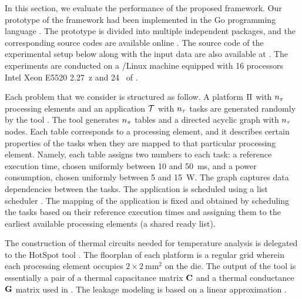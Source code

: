 In this section, we evaluate the performance of the proposed framework. Our
prototype of the framework had been implemented in the Go programming language
\cite{go}. The prototype is divided into multiple independent packages, and the
corresponding source codes are available online \cite{sources}. The source code
of the experimental setup below along with the input data are also available at
\cite{sources}. The experiments are conducted on a /Linux machine
equipped with 16 processors Intel Xeon E5520 2.27~z and 24~ of
.

Each problem that we consider is structured as follow. A platform $\Pi$ with
${n_\pi}$ processing elements and an application $\mathcal{T}$ with ${n_\tau}$ tasks are
generated randomly by the  tool \cite{dick1998}. The tool generates
${n_\pi}$ tables and a directed acyclic graph with ${n_\tau}$ nodes. Each table
corresponds to a processing element, and it describes certain properties of the
tasks when they are mapped to that particular processing element. Namely, each
table assigns two numbers to each task: a reference execution time, chosen
uniformly between 10 and 50~ms, and a power consumption, chosen uniformly
between 5 and 15~W. The graph captures data dependencies between the tasks. The
application is scheduled using a list scheduler \cite{adam1974}. The mapping of
the application is fixed and obtained by scheduling the tasks based on their
reference execution times and assigning them to the earliest available
processing elements (a shared ready list).

The construction of thermal  circuits needed for temperature analysis
is delegated to the HotSpot tool \cite{skadron2004}. The floorplan of each
platform is a regular grid wherein each processing element occupies $2 \times
2~\text{mm}^2$ on the die. The output of the tool is essentially a pair of a
thermal capacitance matrix $\mathbf{C}$ and a thermal conductance $\mathbf{G}$ matrix used in
. The leakage modeling is based on a linear approximation
\cite{yang2013, ukhov2012, liu2007}.

